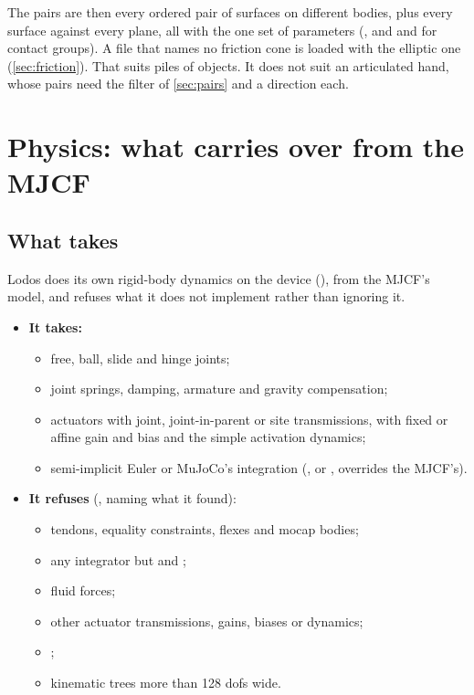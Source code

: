 The pairs are then every ordered pair of surfaces on different bodies, plus every surface against every plane, all with the one set of parameters (, and  and  for contact groups). A file that names no friction cone is loaded with the elliptic one (\cref{sec:friction}). That suits piles of objects. It does not suit an articulated hand, whose pairs need the filter of \cref{sec:pairs} and a direction each.

\section{Physics: what carries over from the MJCF}\label{sec:physics}

\subsection{What  takes}\label{sec:rbdtakes}

Lodos does its own rigid-body dynamics on the device (), from the MJCF's model, and refuses what it does not implement rather than ignoring it.

\begin{itemize}
\item \textbf{It takes:}
  \begin{itemize}
  \item free, ball, slide and hinge joints;
  \item joint springs, damping, armature and gravity compensation;
  \item actuators with joint, joint-in-parent or site transmissions, with fixed or affine gain and bias and the simple activation dynamics;
  \item semi-implicit Euler or MuJoCo's  integration (,  or , overrides the MJCF's).
  \end{itemize}
\item \textbf{It refuses} (, naming what it found):
  \begin{itemize}
  \item tendons, equality constraints, flexes and mocap bodies;
  \item any integrator but  and ;
  \item fluid forces;
  \item other actuator transmissions, gains, biases or dynamics;
  \item {};
  \item kinematic trees more than 128 dofs wide.
  \end{itemize}
\end{itemize}

